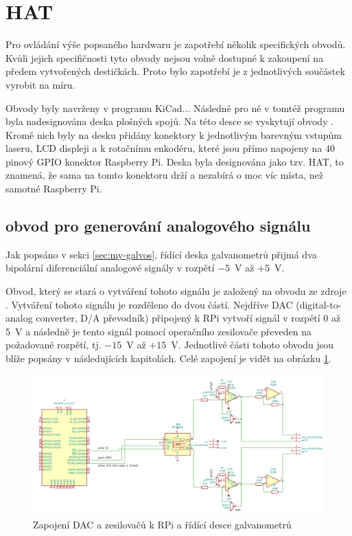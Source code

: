 \section{HAT}
Pro ovládání výše popsaného hardwaru je zapotřebí několik specifických obvodů.
Kvůli jejich specifičnosti tyto obvody nejsou volně dostupné k zakoupení na předem vytvořených destičkách. Proto bylo zapotřebí je z jednotlivých součástek vyrobit na míru.

Obvody byly navrženy v programu KiCad...
Následně pro ně v tomtéž programu byla nadesignována deska plošných spojů. Na této desce se vyskytují obvody .
Kromě nich byly na desku přidány konektory k jednotlivým barevným vstupům laseru, LCD displeji a k rotačnímu enkodéru, které jsou přímo napojeny na 40 pinový GPIO konektor Raspberry Pi.
Deska byla designována jako tzv. HAT, to znamená, že sama na tomto konektoru drží a nezabírá o moc víc místa, než samotné Raspberry Pi.


\subsection{obvod pro generování analogového signálu}
Jak popsáno v sekci \ref{sec:my-galvos}, řídící deska galvanometrů přijmá dva bipolární diferenciální analogové signály v rozpětí $-5$~V až $+5$~V.

Obvod, který se stará o vytváření tohoto signálu je založený na obvodu ze zdroje \cite{lasershow-with-real-galvos}.
Vytváření tohoto signálu je rozděleno do dvou částí. Nejdříve DAC (digital-to-analog converter, D/A převodník) připojený k RPi vytvoří signál v rozpětí 0 až 5~V a následně je tento signál pomocí operačního zesilovače převeden na požadované rozpětí, tj. $-15$~V až $+15$~V.
Jednotlivé části tohoto obvodu jsou blíže popsány v následujících kapitolách. Celé zapojení je vidět na obrázku \ref{fig:dac_board}.
\begin{figure}[!htb]
  \centering
  \includegraphics[width=1\textwidth]{img/dac_board.png} 
  \caption{\label{fig:dac_board}Zapojení DAC a zesilovačů k RPi a řídící desce galvanometrů}
\end{figure}


